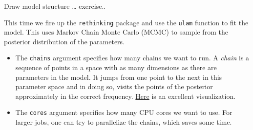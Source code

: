 \documentclass[
]{book}
\begin{document}
Draw model structure \ldots{} exercise..

This time we fire up the \texttt{rethinking} package and use the \texttt{ulam} function
to fit the model.
This uses Markov Chain Monte Carlo (MCMC) to sample from the posterior
distribution of the parameters.

\begin{itemize}
\item
  The \texttt{chains} argument specifies how many chains we want to run.
  A \emph{chain} is a sequence of points in a space with as many dimensions as there
  are parameters in the model. It jumps from one point to the next in this parameter
  space and in doing so, visits the points of the posterior approximately in the correct
  frequency. \href{https://blog.revolutionanalytics.com/2013/09/an-animated-peek-into-the-workings-of-bayesian-statistics.html}{Here}
  is an excellent visualization.
\item
  The \texttt{cores} argument specifies how many CPU cores we want to use.
  For larger jobs, one can try to parallelize
  the chains, which saves some time.
\end{itemize}
\end{document}
